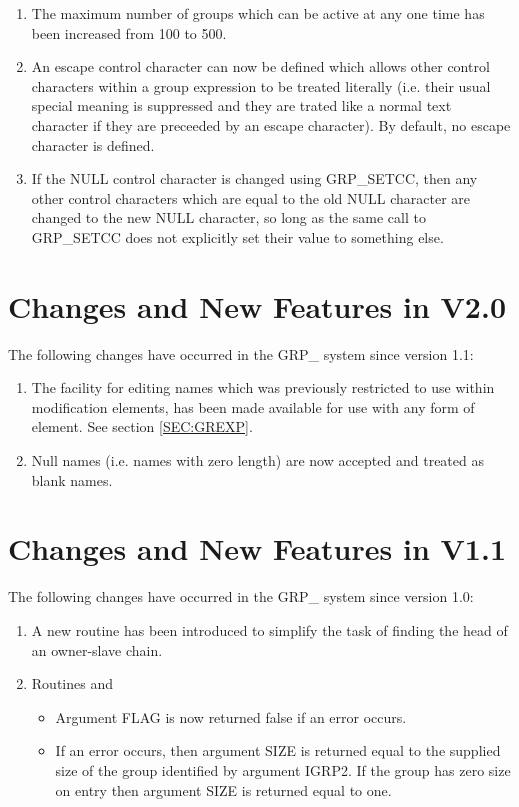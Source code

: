 \begin{enumerate}

\item The maximum number of groups which can be active at any one time
has been increased from 100 to 500.

\item An escape control character can now be defined which allows other
control characters within a group expression to be treated literally
(i.e. their usual special meaning is suppressed and they are trated like a
normal text character if they are preceeded by an escape character). By
default, no escape character is defined.

\item If the NULL control character is changed using GRP\_SETCC, then any
other control characters which are equal to the old NULL character are
changed to the new NULL character, so long as the same call to GRP\_SETCC
does not explicitly set their value to something else.

\end{enumerate}

\section{Changes and New Features in V2.0}
The following changes have occurred in the GRP\_ system since version 1.1:
\begin{enumerate}
\item The facility for editing names which was previously restricted to use
within modification elements, has been made available for use with any form
of element. See section \ref{SEC:GREXP}.
\item Null names (i.e. names with zero length) are now accepted and treated as
blank names.
\end{enumerate}

\section{Changes and New Features in V1.1}
The following changes have occurred in the GRP\_ system since version 1.0:
\begin{enumerate}
\item A new routine  has been introduced to simplify the task of
finding the head of an owner-slave chain.
\item Routines  and 
\begin{itemize}
\item Argument FLAG is now returned false if an error occurs.
\item If an error occurs, then argument SIZE is returned equal to the supplied
size of the group identified by argument IGRP2. If the group has zero size on
entry then argument SIZE is returned equal to one.
\end{itemize}
\end{enumerate}


